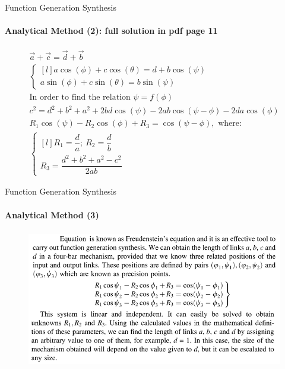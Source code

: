 \documentclass[aspectratio=169]{beamer}
\begin{document}
\begin{frame}[t]{Function Generation Synthesis}
    \framesubtitle{Analytical Method (2): full solution in pdf page 11}
    \vspace{-0.8cm}
    \begin{gather}
        \vec{a} + \vec{c} = \vec{d} + \vec{b} \\ 
        \left\{\begin{matrix*}[l]
        a\cos(\phi) + c\cos(\theta) = d + b \cos(\psi)\\ 
        a\sin(\phi)+c\sin(\theta)=b\sin(\psi)
        \end{matrix*}\right. \\ 
        \text{In order to find the relation $\psi = f(\phi)$} \\ 
        c^2 = d^2 + b^2 + a^2 + 2bd\cos(\psi) - 2ab\cos(\psi - \phi) - 2da\cos(\phi) \\ 
        R_1\cos(\psi) - R_2\cos(\phi) + R_3 = \cos(\psi - \phi), \text{ where: } \\
        \left\{\begin{matrix*}[l]
        R_1=\dfrac{d}{a};\ R_2 = \dfrac{d}{b}\\ 
        R_3 = \dfrac{d^2+b^2+a^2-c^2}{2ab}
        \end{matrix*}\right.
    \end{gather}
\end{frame}

\begin{frame}[t]{Function Generation Synthesis}
    \framesubtitle{Analytical Method (3)}
    \vspace{-0.7cm}
    \begin{figure}[H]
        \centering\includegraphics[height=6cm,width=1\textwidth,keepaspectratio]{func_gen10.png}
        \label{fig:func_gen10.png}
    \end{figure}
\end{frame}
\end{document}
